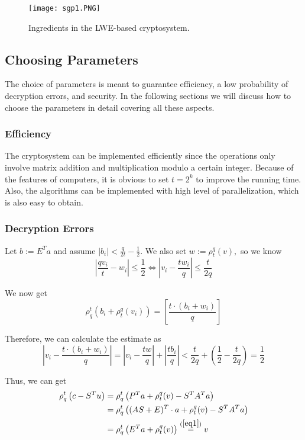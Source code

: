 \begin{figure}[htbp]
    \centering
    \texttt{[image: sgp1.PNG]}
    \caption{Ingredients in the LWE-based cryptosystem.}
    \label{fig1}
\end{figure}

\subsection{Choosing Parameters}

The choice of parameters is meant to guarantee efficiency, a low probability of decryption errors, and security. In the following sections we will discuss how to choose the parameters in detail covering all these aspects.

\subsubsection{Efficiency}

The cryptosystem can be implemented efficiently since the operations only involve matrix addition and multiplication modulo a certain integer. Because of the features of computers, it is obvious to set $t=2^k$ to improve the running time. Also, the algorithms can be implemented with high level of parallelization, which is also easy to obtain.

\subsubsection{Decryption Errors}

Let $b :=E^{T} a$ and assume $\left|b_{i}\right|<\frac{q}{2 t}-\frac{1}{2} .$ We also set $w :=\rho_{t}^{q}(v),$ so we know
$$\left|\frac{q v_{i}}{t}-w_{i}\right| \leq \frac{1}{2} \Leftrightarrow\left|v_{i}-\frac{t w_{i}}{q}\right| \leq \frac{t}{2 q}$$

We now get 
$$\rho_{q}^{t}\left(b_{i}+\rho_{t}^{q}\left(v_{i}\right)\right)=\left[\frac{t \cdot\left(b_{i}+w_{i}\right)}{q}\right]$$

Therefore, we can calculate the estimate as
\begin{equation}
    \left|v_{i}-\frac{t \cdot\left(b_{i}+w_{i}\right)}{q}\right|=\left|v_{i}-\frac{t w}{q}\right|+\left|\frac{t b_{i}}{q}\right|<\frac{t}{2 q}+\left(\frac{1}{2}-\frac{t}{2 q}\right)=\frac{1}{2}\label{eq1}
\end{equation}

Thus, we can get 
\begin{align*}
    \rho_{q}^{t}\left(c-S^{T} u\right)&=\rho_{q}^{t}\left(P^{T} a+\rho_{t}^{q}(v)-S^{T} A^{T} a\right)\\
    &=\rho_{q}^{t}\left((A S+E)^{T} \cdot a+\rho_{t}^{q}(v)-S^{T} A^{T} a\right)\\
    &=\rho_{q}^{t}\left(E^{T} a+\rho_{t}^{q}(v)\right) \stackrel{(\ref{eq1})}{=} v
\end{align*}

